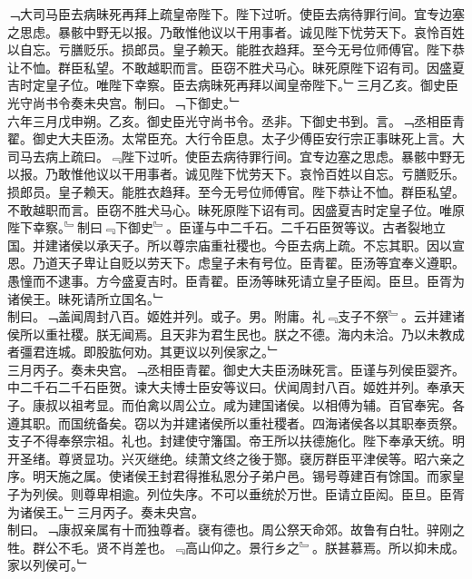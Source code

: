 \documentclass{zhvt-classic}
\begin{document}

\hspace*{2em}﹁大司马臣去病昧死再拜上疏皇帝陛下。陛下过听。使臣去病待罪行间。宜专边塞之思虑。暴骸中野无以报。乃敢惟他议以干用事者。诚见陛下忧劳天下。哀怜百姓以自忘。亏膳贬乐。损郎员。皇子赖天。能胜衣趋拜。至今无号位师傅官。陛下恭让不恤。群臣私望。不敢越职而言。臣窃不胜犬马心。昧死原陛下诏有司。因盛夏吉时定皇子位。唯陛下幸察。臣去病昧死再拜以闻皇帝陛下。﹂三月乙亥。御史臣光守尚书令奏未央宫。制曰。﹁下御史。﹂\\
\hspace*{2em}六年三月戊申朔。乙亥。御史臣光守尚书令。丞非。下御史书到。言。﹁丞相臣青翟。御史大夫臣汤。太常臣充。大行令臣息。太子少傅臣安行宗正事昧死上言。大司马去病上疏曰。﹃陛下过听。使臣去病待罪行间。宜专边塞之思虑。暴骸中野无以报。乃敢惟他议以干用事者。诚见陛下忧劳天下。哀怜百姓以自忘。亏膳贬乐。损郎员。皇子赖天。能胜衣趋拜。至今无号位师傅官。陛下恭让不恤。群臣私望。不敢越职而言。臣窃不胜犬马心。昧死原陛下诏有司。因盛夏吉时定皇子位。唯原陛下幸察。﹄制曰﹃下御史﹄。臣谨与中二千石。二千石臣贺等议。古者裂地立国。并建诸侯以承天子。所以尊宗庙重社稷也。今臣去病上疏。不忘其职。因以宣恩。乃道天子卑让自贬以劳天下。虑皇子未有号位。臣青翟。臣汤等宜奉义遵职。愚憧而不逮事。方今盛夏吉时。臣青翟。臣汤等昧死请立皇子臣闳。臣旦。臣胥为诸侯王。昧死请所立国名。﹂\\
\hspace*{2em}制曰。﹁盖闻周封八百。姬姓并列。或子。男。附庸。礼﹃支子不祭﹄。云并建诸侯所以重社稷。朕无闻焉。且天非为君生民也。朕之不德。海内未洽。乃以未教成者彊君连城。即股肱何劝。其更议以列侯家之。﹂\\
\hspace*{2em}三月丙子。奏未央宫。﹁丞相臣青翟。御史大夫臣汤昧死言。臣谨与列侯臣婴齐。中二千石二千石臣贺。谏大夫博士臣安等议曰。伏闻周封八百。姬姓并列。奉承天子。康叔以祖考显。而伯禽以周公立。咸为建国诸侯。以相傅为辅。百官奉宪。各遵其职。而国统备矣。窃以为并建诸侯所以重社稷者。四海诸侯各以其职奉贡祭。支子不得奉祭宗祖。礼也。封建使守籓国。帝王所以扶德施化。陛下奉承天统。明开圣绪。尊贤显功。兴灭继绝。续萧文终之後于酂。襃厉群臣平津侯等。昭六亲之序。明天施之属。使诸侯王封君得推私恩分子弟户邑。锡号尊建百有馀国。而家皇子为列侯。则尊卑相逾。列位失序。不可以垂统於万世。臣请立臣闳。臣旦。臣胥为诸侯王。﹂三月丙子。奏未央宫。\\
\hspace*{2em}制曰。﹁康叔亲属有十而独尊者。襃有德也。周公祭天命郊。故鲁有白牡。骍刚之牲。群公不毛。贤不肖差也。﹃高山仰之。景行乡之﹄。朕甚慕焉。所以抑未成。家以列侯可。﹂\\
\end{document}
